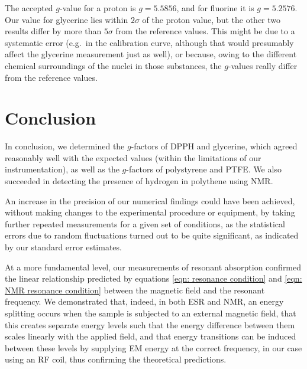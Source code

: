 \documentclass[a4paper]{jpconf}
\numberwithin{equation}{section}
\begin{document}
The accepted $g$-value for a proton is $g = 5.5856$, and for fluorine it is $g = 5.2576$. Our value for glycerine lies within $2\sigma$ of the proton value, but the other two results differ by more than $5\sigma$ from the reference values. This might be due to a systematic error (e.g.\ in the calibration curve, although that would presumably affect the glycerine measurement just as well), or because, owing to the different chemical surroundings of the nuclei in those substances, the $g$-values really differ from the reference values.

\section{Conclusion}

In conclusion, we determined the $g$-factors of DPPH and glycerine, which agreed reasonably well with the expected values (within the limitations of our instrumentation), as well as the $g$-factors of polystyrene and PTFE. We also succeeded in detecting the presence of hydrogen in polythene using NMR. 

An increase in the precision of our numerical findings could have been achieved, without making changes to the experimental procedure or equipment, by taking further repeated measurements for a given set of conditions, as the statistical errors due to random fluctuations turned out to be quite significant, as indicated by our standard error estimates. 

At a more fundamental level, our measurements of resonant absorption confirmed the linear relationship predicted by equations \eqref{eqn: resonance condition} and \eqref{eqn: NMR resonance condition} between the magnetic field and the resonant frequency. We demonstrated that, indeed, in both ESR and NMR, an energy splitting occurs when the sample is subjected to an external magnetic field, that this creates separate energy levels such that the energy difference between them scales linearly with the applied field, and that energy transitions can be induced between these levels by supplying EM energy at the correct frequency, in our case using an RF coil, thus confirming the theoretical predictions. 


\end{document}
